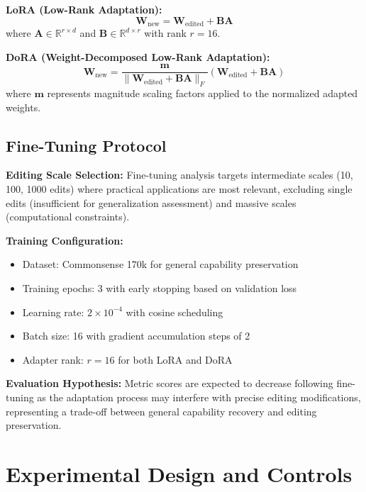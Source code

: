 \textbf{LoRA (Low-Rank Adaptation):}
\begin{equation}
\mathbf{W}_{\text{new}} = \mathbf{W}_{\text{edited}} + \mathbf{B}\mathbf{A}
\end{equation}
where $\mathbf{A} \in \mathbb{R}^{r \times d}$ and $\mathbf{B} \in \mathbb{R}^{d \times r}$ with rank $r = 16$.

\textbf{DoRA (Weight-Decomposed Low-Rank Adaptation):}
\begin{equation}
\mathbf{W}_{\text{new}} = \frac{\mathbf{m}}{\|\mathbf{W}_{\text{edited}} + \mathbf{B}\mathbf{A}\|_F} (\mathbf{W}_{\text{edited}} + \mathbf{B}\mathbf{A})
\end{equation}
where $\mathbf{m}$ represents magnitude scaling factors applied to the normalized adapted weights.

\subsection{Fine-Tuning Protocol}

\textbf{Editing Scale Selection:} Fine-tuning analysis targets intermediate scales (10, 100, 1000 edits) where practical applications are most relevant, excluding single edits (insufficient for generalization assessment) and massive scales (computational constraints).

\textbf{Training Configuration:}
\begin{itemize}
    \item Dataset: Commonsense 170k for general capability preservation
    \item Training epochs: 3 with early stopping based on validation loss
    \item Learning rate: $2 \times 10^{-4}$ with cosine scheduling
    \item Batch size: 16 with gradient accumulation steps of 2
    \item Adapter rank: $r = 16$ for both LoRA and DoRA
\end{itemize}

\textbf{Evaluation Hypothesis:} Metric scores are expected to decrease following fine-tuning as the adaptation process may interfere with precise editing modifications, representing a trade-off between general capability recovery and editing preservation.

\section{Experimental Design and Controls}

